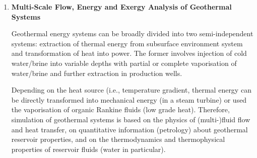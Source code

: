 \documentclass[12pts,a4paper,amsmath,amssymb,floatfix]{article}%
\newcommand{\all}{MSc O$\&$GE, Chemical/Mechanical/Petroleum Engineering}
\begin{document}
\begin{enumerate}[label=\bfseries Project: \arabic*:]
\noindent
{\bf Specifics:} 
\begin{enumerate}
\item Computational/Theoretical/Review (\all) -- 1 student.
\item The student is required to develop an initial thermodynamic solid-liquid-vapour equilibrium (SLVE) formulation;
\item This formulation will be $\lq$translated' into a code (e.g., Matlab, Python etc) and coupled with a optimisation software to assess its initial reliability/accuracy.
\end{enumerate}

\noindent
{\bf References:}
\begin{itemize}
\item Mansoori (1997) $\lq$Modeling of Asphaltene and Other Heavy Organic Depositions’, Journal of Petroleum Science and Engineering 17:101-111;
\item Hu et al. (2000) $\lq$A Study on the Application of Scaling Equation for Asphaltene Precipitation’, Fluid Phase Equilibria 171:181-185;
\item Pazuki et al. (2007) $\lq$Application of a New Cubic EOS to Computation of Phase Behaviour of Fluids and Asphaltene Precipitation in Crude Oil’, Fluid Phase Equilibria 254:42-48;
\item Artola et al. (2011) $\lq$Understanding the Fluid Phase Behaviour of Crude Oil: Asphaltene Precipitation’, Fluid Phase Equilibria 306:129-136;
\end{itemize}


\clearpage
\item {\bf Multi-Scale Flow, Energy and Exergy Analysis of Geothermal Systems}

Geothermal energy systems can be broadly divided into two semi-independent systems: extraction of thermal energy from subsurface environment system and transformation of heat into power. The former involves injection of cold water/brine into variable depths with partial or complete vaporisation of water/brine and further extraction in production wells. 

Depending on the heat source (i.e., temperature gradient, thermal energy can be directly transformed into mechanical energy (in a steam turbine) or used the vaporisation of organic Rankine fluids (low grade heat). Therefore, simulation of geothermal systems is based on the physics of (multi-)fluid flow and heat transfer, on quantitative information (petrology) about geothermal reservoir properties, and on the thermodynamics and thermophysical properties of reservoir fluids (water in particular). 



\end{enumerate}
\end{document}

